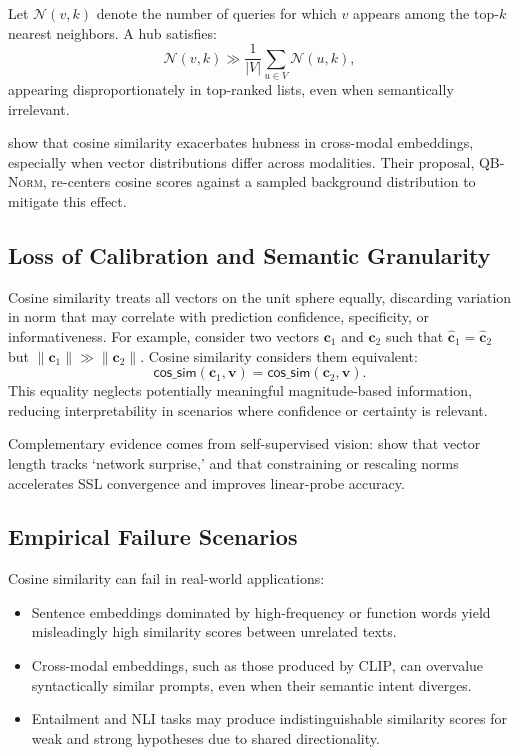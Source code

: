 \documentclass[11pt]{article}
\newcommand{\cossim}{\textsf{cos\_sim}}
\begin{document}
Let $\mathcal{N}(v, k)$ denote the number of queries for which $v$ appears among the top-$k$ nearest neighbors. A hub satisfies:
\begin{equation*}
	\mathcal{N}(v, k) \gg \frac{1}{|V|} \sum_{u \in V} \mathcal{N}(u, k),
\end{equation*}
appearing disproportionately in top-ranked lists, even when semantically irrelevant.

\citet{bogolin_2022_CrossModalRetrieval} show that cosine similarity exacerbates hubness in cross-modal embeddings, especially when vector distributions differ across modalities. Their proposal, \textsc{QB-Norm}, re-centers cosine scores against a sampled background distribution to mitigate this effect.


\subsection{Loss of Calibration and Semantic Granularity}

Cosine similarity treats all vectors on the unit sphere equally, discarding variation in norm that may correlate with prediction confidence, specificity, or informativeness. For example, consider two vectors $\mathbf{c}_1$ and $\mathbf{c}_2$ such that $\hat{\mathbf{c}}_1 = \hat{\mathbf{c}}_2$ but $\|\mathbf{c}_1\| \gg \|\mathbf{c}_2\|$. Cosine similarity considers them equivalent:
\begin{equation*}
\cossim(\mathbf{c}_1, \mathbf{v}) =  \cossim(\mathbf{c}_2, \mathbf{v}).
\end{equation*}
This equality neglects potentially meaningful magnitude-based information, reducing interpretability in scenarios where confidence or certainty is relevant.

Complementary evidence comes from self-supervised vision: \citet{draganov_2025_ImportanceEmbeddingNorms} show that vector length tracks ‘network surprise,’ and that constraining or rescaling norms accelerates SSL convergence and improves linear-probe accuracy.




\subsection{Empirical Failure Scenarios}

Cosine similarity can fail in real-world applications:
\begin{itemize}
	\setlength\leftskip{-1em} 
	\item {Sentence embeddings} dominated by high-frequency or function words yield misleadingly high similarity scores between unrelated texts.
	\item {Cross-modal embeddings}, such as those produced by \textsc{CLIP}, can overvalue syntactically similar prompts, even when their semantic intent diverges.
	\item {Entailment and NLI tasks} may produce indistinguishable similarity scores for weak and strong hypotheses due to shared directionality.
\end{itemize}
\end{document}
